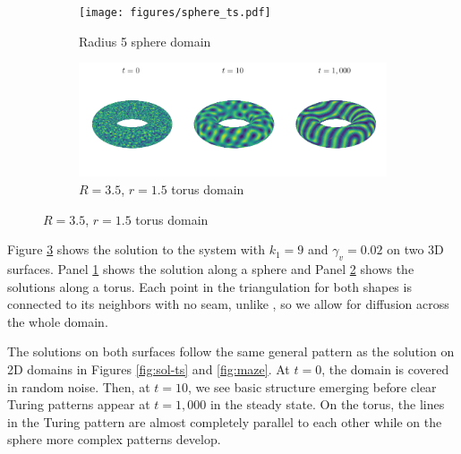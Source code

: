 \begin{figure}[t]
    \centering
    \caption{Solution to the reaction-diffusion system on 3D surfaces}

    \begin{subfigure}{\textwidth}
        \centering
        \texttt{[image: figures/sphere\_ts.pdf]}
        \caption{Radius 5 sphere domain}
        \label{subfig:sphere}
    \end{subfigure}

    \begin{subfigure}{\textwidth}
        \centering
        \includegraphics{figures/torus_ts.pdf}
        \caption{$R = 3.5$, $r = 1.5$ torus domain}
        \label{subfig:torus}
    \end{subfigure}

    \label{fig:3d-shapes}
\end{figure}

Figure \ref{fig:3d-shapes} shows the solution to the system with $k_1 = 9$ and $\gamma_v = 0.02$ on two 3D surfaces. Panel \ref{subfig:sphere} shows the solution along a sphere and Panel \ref{subfig:torus} shows the solutions along a torus. Each point in the triangulation for both shapes is connected to its neighbors with no seam, unlike \autocite{leon2021full}, so we allow for diffusion across the whole domain.

The solutions on both surfaces follow the same general pattern as the solution on 2D domains in Figures \ref{fig:sol-ts} and \ref{fig:maze}. At $t = 0$, the domain is covered in random noise. Then, at $t = 10$, we see basic structure emerging before clear Turing patterns appear at $t = 1,000$ in the steady state. On the torus, the lines in the Turing pattern are almost completely parallel to each other while on the sphere more complex patterns develop.
